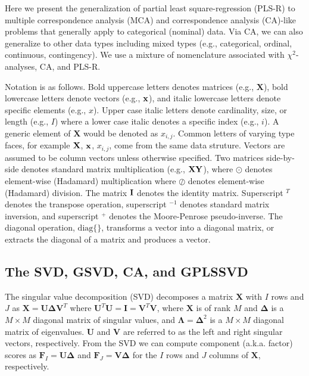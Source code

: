 \documentclass[12pt]{article}
\begin{document}
\label{section:PLSCAR}

Here we present the generalization of partial least square-regression
(PLS-R) to multiple correspondence analysis (MCA) and correspondence
analysis (CA)-like problems that generally apply to categorical
(nominal) data. Via CA, we can also generalize to other data types
including mixed types (e.g., categorical, ordinal, continuous,
contingency). We use a mixture of nomenclature associated with
\(\chi^2\)-analyses, CA, and PLS-R.

Notation is as follows. Bold uppercase letters denotes matrices (e.g.,
\(\mathbf{X}\)), bold lowercase letters denote vectors (e.g.,
\(\bf{x}\)), and italic lowercase letters denote specific elements
(e.g., \(x\)). Upper case italic letters denote cardinality, size, or
length (e.g., \(I\)) where a lower case italic denotes a specific index
(e.g., \(i\)). A generic element of \(\mathbf{X}\) would be denoted as
\(x_{i,j}\). Common letters of varying type faces, for example
\({\bf X}\), \(\bf{x}\), \(x_{i,j}\), come from the same data struture.
Vectors are assumed to be column vectors unless otherwise specified. Two
matrices side-by-side denotes standard matrix multiplication (e.g.,
\(\bf{X}\bf{Y}\)), where \(\odot\) denotes element-wise (Hadamard)
multiplication where \(\oslash\) denotes element-wise (Hadamard)
division. The matrix \({\bf I}\) denotes the identity matrix.
Superscript \(^{T}\) denotes the transpose operation, superscript
\(^{-1}\) denotes standard matrix inversion, and superscript \(^{+}\)
denotes the Moore-Penrose pseudo-inverse. The diagonal operation,
\(\mathrm{diag\{\}}\), transforms a vector into a diagonal matrix, or
extracts the diagonal of a matrix and produces a vector.

\hypertarget{the-svd-gsvd-ca-and-gplssvd}{%
\subsection{The SVD, GSVD, CA, and
GPLSSVD}\label{the-svd-gsvd-ca-and-gplssvd}}

\label{section:GSVDCA}

The singular value decomposition (SVD) decomposes a matrix
\({\mathbf X}\) with \(I\) rows and \(J\) as
\({\mathbf X} = {\mathbf U} {\boldsymbol \Delta} {\mathbf V}^{T}\) where
\({\mathbf U}^{T}{\mathbf U} = {\mathbf I} = {\mathbf V}^{T}{\mathbf V}\),
where \({\mathbf X}\) is of rank \(M\) and \({\boldsymbol \Delta}\) is a
\(M \times M\) diagonal matrix of singular values, and
\({\boldsymbol \Lambda} = {\boldsymbol \Delta}^2\) is a \(M \times M\)
diagonal matrix of eigenvalues. \({\mathbf U}\) and \({\mathbf V}\) are
referred to as the left and right singular vectors, respectively. From
the SVD we can compute component (a.k.a. factor) scores as
\({\mathbf F}_{I} = {\mathbf U}{\boldsymbol \Delta}\) and
\({\mathbf F}_{J} = {\mathbf V}{\boldsymbol \Delta}\) for the \(I\) rows
and \(J\) columns of \({\mathbf X}\), respectively.
\end{document}

